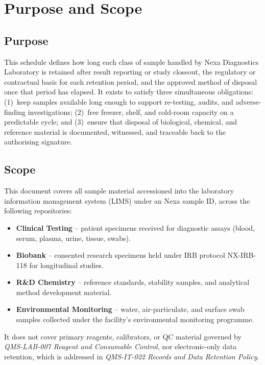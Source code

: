 
\section{Purpose and Scope}

\subsection{Purpose}
This schedule defines how long each class of sample handled by Nexa Diagnostics Laboratory
is retained after result reporting or study closeout, the regulatory or contractual basis for
each retention period, and the approved method of disposal once that period has elapsed. It
exists to satisfy three simultaneous obligations: (1)~keep samples available long enough to
support re-testing, audits, and adverse-finding investigations; (2)~free freezer, shelf, and
cold-room capacity on a predictable cycle; and (3)~ensure that disposal of biological,
chemical, and reference material is documented, witnessed, and traceable back to the
authorising signature.

\subsection{Scope}
This document covers all sample material accessioned into the laboratory information
management system (LIMS) under an Nexa sample ID, across the following repositories:

\begin{itemize}
  \item \textbf{Clinical Testing} -- patient specimens received for diagnostic assays (blood,
        serum, plasma, urine, tissue, swabs).
  \item \textbf{Biobank} -- consented research specimens held under IRB protocol NX-IRB-118
        for longitudinal studies.
  \item \textbf{R\&D Chemistry} -- reference standards, stability samples, and analytical
        method development material.
  \item \textbf{Environmental Monitoring} -- water, air-particulate, and surface swab samples
        collected under the facility's environmental monitoring programme.
\end{itemize}

It does not cover primary reagents, calibrators, or QC material governed by
\emph{QMS-LAB-007 Reagent and Consumable Control}, nor electronic-only data retention, which is
addressed in \emph{QMS-IT-022 Records and Data Retention Policy}.

